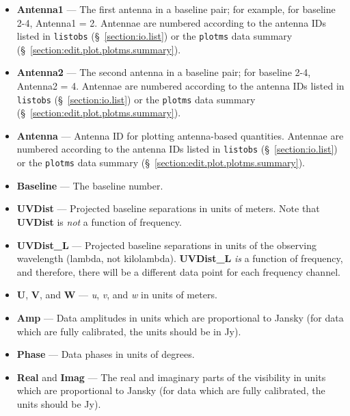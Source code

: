 \begin{itemize}
\item {\bf Antenna1} --- The first antenna in a baseline pair; for example, for baseline 2-4, Antenna1 = 2. Antennae are numbered according to the antenna IDs listed in {\tt listobs} (\S~\ref{section:io.list}) or the {\tt plotms} data summary (\S~\ref{section:edit.plot.plotms.summary}).

\item {\bf Antenna2} --- The second antenna in a baseline pair; for baseline 2-4, Antenna2 = 4. Antennae are numbered according to the antenna IDs listed in {\tt listobs} (\S~\ref{section:io.list}) or the {\tt plotms} data summary (\S~\ref{section:edit.plot.plotms.summary}).

\item {\bf Antenna} --- Antenna ID for plotting antenna-based quantities. Antennae are numbered according to the antenna IDs listed in {\tt listobs} (\S~\ref{section:io.list}) or the {\tt plotms} data summary (\S~\ref{section:edit.plot.plotms.summary}).

\item {\bf  Baseline} --- The baseline number.

\item {\bf UVDist} --- Projected baseline separations in units of meters. Note that {\bf UVDist} is {\it not} a function of frequency.

\item {\bf UVDist\_L} --- Projected baseline separations in units of the observing wavelength (lambda, not kilolambda). {\bf UVDist\_L} {\it is} a function of frequency, and therefore, there will be a different data point for each frequency channel.

\item {\bf U}, {\bf V}, and {\bf W} --- {\it u}, {\it v}, and {\it w} in units of meters.

\item {\bf Amp} --- Data amplitudes in units which are proportional to Jansky (for data which are fully calibrated, the units should be in Jy).

\item {\bf Phase} --- Data phases in units of degrees.

\item {\bf Real} and {\bf Imag} --- The real and imaginary parts of the visibility in units which are proportional to Jansky (for data which are fully calibrated, the units should be Jy).


\end{itemize}
